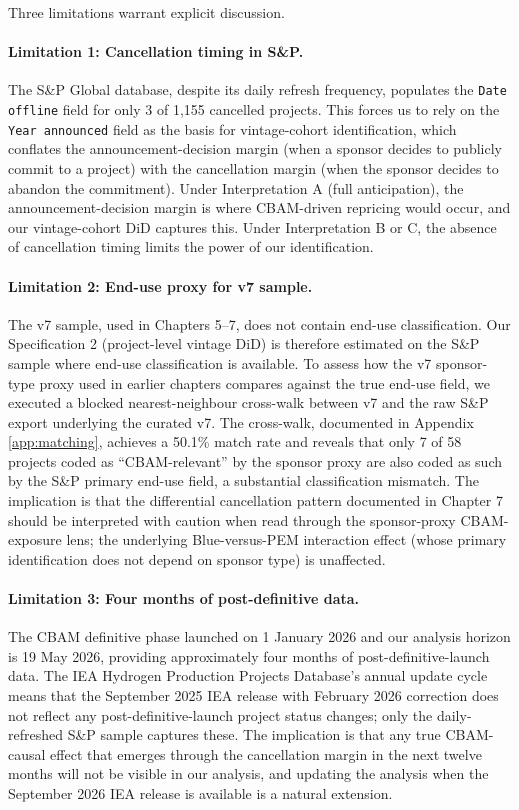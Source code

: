 \documentclass[11pt,a4paper]{article}
\begin{document}
Three limitations warrant explicit discussion.

\paragraph{Limitation 1: Cancellation timing in S\&P.}
The S\&P Global database, despite its daily refresh frequency, populates the \texttt{Date offline} field for only 3 of 1{,}155 cancelled projects. This forces us to rely on the \texttt{Year announced} field as the basis for vintage-cohort identification, which conflates the announcement-decision margin (when a sponsor decides to publicly commit to a project) with the cancellation margin (when the sponsor decides to abandon the commitment). Under Interpretation A (full anticipation), the announcement-decision margin is where CBAM-driven repricing would occur, and our vintage-cohort DiD captures this. Under Interpretation B or C, the absence of cancellation timing limits the power of our identification.

\paragraph{Limitation 2: End-use proxy for v7 sample.}
The v7 sample, used in Chapters 5--7, does not contain end-use classification. Our Specification 2 (project-level vintage DiD) is therefore estimated on the S\&P sample where end-use classification is available. To assess how the v7 sponsor-type proxy used in earlier chapters compares against the true end-use field, we executed a blocked nearest-neighbour cross-walk between v7 and the raw S\&P export underlying the curated v7. The cross-walk, documented in Appendix \ref{app:matching}, achieves a 50.1\% match rate and reveals that only 7 of 58 projects coded as ``CBAM-relevant'' by the sponsor proxy are also coded as such by the S\&P primary end-use field, a substantial classification mismatch. The implication is that the differential cancellation pattern documented in Chapter 7 should be interpreted with caution when read through the sponsor-proxy CBAM-exposure lens; the underlying Blue-versus-PEM interaction effect (whose primary identification does not depend on sponsor type) is unaffected.

\paragraph{Limitation 3: Four months of post-definitive data.}
The CBAM definitive phase launched on 1 January 2026 and our analysis horizon is 19 May 2026, providing approximately four months of post-definitive-launch data. The IEA Hydrogen Production Projects Database's annual update cycle means that the September 2025 IEA release with February 2026 correction does not reflect any post-definitive-launch project status changes; only the daily-refreshed S\&P sample captures these. The implication is that any true CBAM-causal effect that emerges through the cancellation margin in the next twelve months will not be visible in our analysis, and updating the analysis when the September 2026 IEA release is available is a natural extension.
\end{document}
